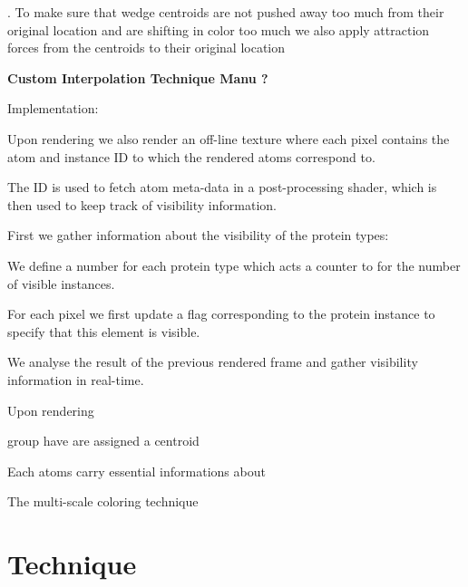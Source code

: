 \documentclass[review,journal]{vgtc}         %
\begin{document}
. To make sure that wedge centroids are not pushed away too much from their original location and are shifting in color too much we also apply attraction forces from the centroids to their original location




\textbf{Custom Interpolation Technique Manu ?}

Implementation:

Upon rendering we also render an off-line texture where each pixel contains the atom and instance ID to which the rendered atoms correspond to.

The ID is used to fetch atom meta-data in a post-processing shader, which is then used to keep track of visibility information.

First we gather information about the visibility of the protein types:

We define a number for each protein type which acts a counter to for the number of visible instances.

For each pixel we first update a flag corresponding to the protein instance to specify that this element is visible.





We analyse the result of the previous rendered frame and gather visibility information in real-time.

Upon rendering 




group have are assigned a centroid



Each atoms carry essential informations about 

The multi-scale coloring technique 

\section{Technique}
\end{document}
